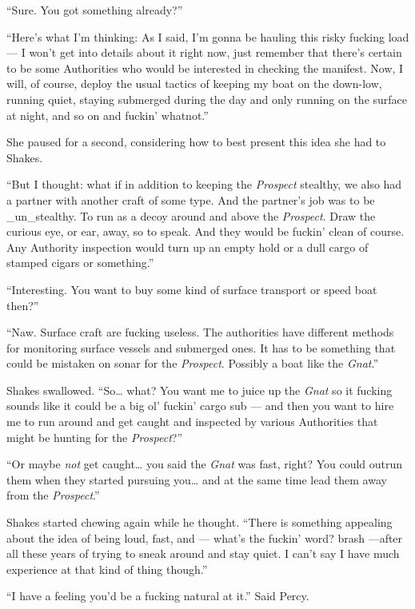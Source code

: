 \documentclass[
]{scrbook}
\begin{document}
``Sure. You got something already?''

``Here's what I'm thinking: As I said, I'm gonna be hauling this risky
fucking load --- I won't get into details about it right now, just
remember that there's certain to be some Authorities who would be
interested in checking the manifest. Now, I will, of course, deploy the
usual tactics of keeping my boat on the down-low, running quiet, staying
submerged during the day and only running on the surface at night, and
so on and fuckin' whatnot.''

She paused for a second, considering how to best present this idea she
had to Shakes.

``But I thought: what if in addition to keeping the \emph{Prospect}
stealthy, we also had a partner with another craft of some type. And the
partner's job was to be \_un\_stealthy. To run as a decoy around and
above the \emph{Prospect}. Draw the curious eye, or ear, away, so to
speak. And they would be fuckin' clean of course. Any Authority
inspection would turn up an empty hold or a dull cargo of stamped cigars
or something.''

``Interesting. You want to buy some kind of surface transport or speed
boat then?''

``Naw. Surface craft are fucking useless. The authorities have different
methods for monitoring surface vessels and submerged ones. It has to be
something that could be mistaken on sonar for the \emph{Prospect}.
Possibly a boat like the \emph{Gnat}.''

Shakes swallowed. ``So\ldots{} what? You want me to juice up the
\emph{Gnat} so it fucking sounds like it could be a big ol' fuckin'
cargo sub --- and then you want to hire me to run around and get caught
and inspected by various Authorities that might be hunting for the
\emph{Prospect}?''

``Or maybe \emph{not} get caught\ldots{} you said the \emph{Gnat} was
fast, right? You could outrun them when they started pursuing
you\ldots{} and at the same time lead them away from the
\emph{Prospect}.''

Shakes started chewing again while he thought. ``There is something
appealing about the idea of being loud, fast, and --- what's the fuckin'
word? brash ---after all these years of trying to sneak around and stay
quiet. I can't say I have much experience at that kind of thing
though.''

``I have a feeling you'd be a fucking natural at it.'' Said Percy.
\end{document}
